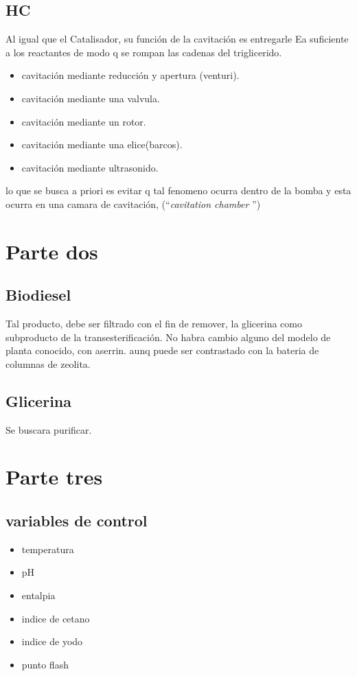 \documentclass[a4paper,10pt]{article}
\begin{document}
\subsection{HC}
Al igual que el Catalisador, su función de la cavitación es entregarle Ea suficiente a los reactantes de modo q se rompan las cadenas del triglicerido.
\begin{itemize}
 \item cavitación mediante reducción y apertura (venturi).
 \item cavitación mediante una valvula.
 \item cavitación mediante un rotor.
 \item cavitación mediante una elice(barcos).
 \item cavitación mediante ultrasonido.
\end{itemize}

lo que se busca a priori es evitar q tal fenomeno ocurra dentro de la bomba y esta ocurra en una camara de cavitación, (\textquotedblleft \emph{cavitation chamber} \textquotedblright)

\section{Parte dos}
\subsection{Biodiesel}
Tal producto, debe ser filtrado con el fin de remover, la glicerina como subproducto de la transesterificación. No habra cambio alguno del modelo de planta conocido, con aserrin. aunq puede ser contrastado con la bateria de columnas de zeolita.

\subsection{Glicerina}
Se buscara purificar.

\section{Parte tres}
\subsection{variables de control}
\begin{itemize}
 \item temperatura
 \item pH
 \item entalpia
 \item indice de cetano
 \item indice de yodo
 \item punto flash
\end{itemize}
\end{document}
